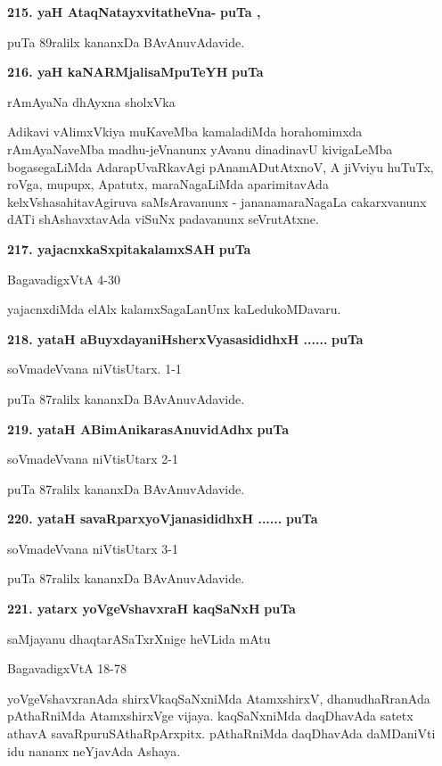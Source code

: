 \medskip
\noindent
\textbf{215. yaH AtaqNatayxvitatheVna-} \hfill{\bf puTa \pageref{48a}, \pageref{91c}}

\smallskip
puTa 89ralilx kananxDa BAvAnuvAdavide.

\medskip
\noindent
\textbf{216. yaH kaNARMjalisaMpuTeYH} \hfill{\bf puTa \pageref{238}}

\hfill{rAmAyaNa dhAyxna sholxVka}

\smallskip
Adikavi vAlimxVkiya muKaveMba kamaladiMda horahomimxda rAmAyaNaveMba madhu-jeVnanunx yAvanu dinadinavU kivigaLeMba bogasegaLiMda AdarapUvaRkavAgi pAnamADutAtxnoV, A jiVviyu huTuTx, roVga, mupupx, Apatutx, maraNagaLiMda aparimitavAda kelxVshasahitavAgiruva saMsAravanunx - jananamaraNagaLa cakarxvanunx dATi shAshavxtavAda viSuNx padavanunx seVrutAtxne.

\medskip
\noindent
\textbf{217. yajacnxkaSxpitakalamxSAH} \hfill{\bf puTa \pageref{228}}

\hfill{BagavadigxVtA 4-30}

\smallskip
yajacnxdiMda elAlx kalamxSagaLanUnx kaLedukoMDavaru.

\medskip
\noindent
\textbf{218. yataH aBuyxdayaniHsherxVyasasididhxH ......} \hfill{\bf puTa \pageref{94g}}

\hfill{soVmadeVvana niVtisUtarx. 1-1}

\smallskip
puTa 87ralilx kananxDa BAvAnuvAdavide.

\medskip
\noindent
\textbf{219. yataH ABimAnikarasAnuvidAdhx} \hfill{\bf puTa \pageref{94i}}

\hfill{soVmadeVvana niVtisUtarx 2-1}

\smallskip
puTa 87ralilx kananxDa BAvAnuvAdavide.

\medskip
\noindent
\textbf{220. yataH savaRparxyoVjanasididhxH ......} \hfill{\bf puTa \pageref{94h}}

\hfill{soVmadeVvana niVtisUtarx 3-1}

\smallskip
puTa 87ralilx kananxDa BAvAnuvAdavide.

\medskip
\noindent
\textbf{221. yatarx yoVgeVshavxraH kaqSaNxH} \hfill{\bf puTa \pageref{73a}}

\smallskip
saMjayanu dhaqtarASaTxrXnige heVLida mAtu

\hfill{BagavadigxVtA 18-78}

\smallskip
yoVgeVshavxranAda shirxVkaqSaNxniMda AtamxshirxV, dhanudhaRranAda pAthaRniMda AtamxshirxVge vijaya. kaqSaNxniMda daqDhavAda satetx athavA savaRpuruSAthaRpArxpitx. pAthaRniMda daqDhavAda daMDaniVti idu nananx neYjavAda Ashaya.

